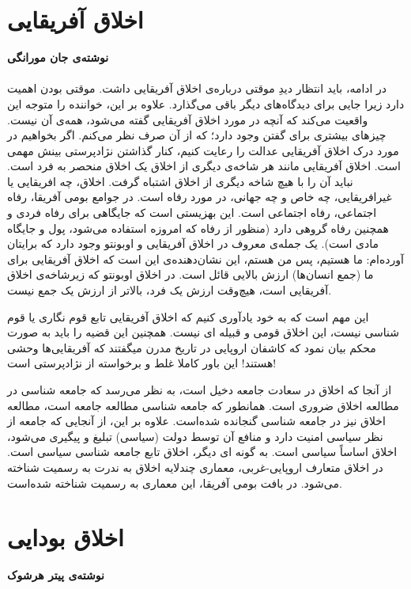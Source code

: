 \newpage


\section*{اخلاق آفریقایی}
\label{sec:اخلاق آفریقایی}
\textbf{نوشته‌ی جان مورانگی}
\paragraph{}
در ادامه، باید انتظار دیدِ موقتی درباره‌ی اخلاق آفریقایی داشت.
موقتی بودن اهمیت دارد زیرا جایی برای دیدگاه‌های دیگر باقی می‌گذارد.
علاوه بر این، خواننده را متوجه این واقعیت می‌کند که آنچه در مورد اخلاق آفریقایی گفته می‌شود، همه‌ی آن نیست.
چیزهای بیشتری برای گفتن وجود دارد؛ که از آن صرف نظر می‌کنم.
اگر بخواهیم در مورد درک اخلاق آفریقایی عدالت را رعایت کنیم، کنار گذاشتن نژادپرستی بینش مهمی است.
اخلاق آفریقایی مانند هر شاخه‌ی دیگری از اخلاق یک اخلاق منحصر به فرد است.
نباید آن را با هیچ شاخه دیگری از اخلاق اشتباه گرفت.
اخلاق، چه افریقایی یا غیرافریقایی، چه خاص و چه جهانی، در مورد رفاه است.
در جوامع بومی آفریقا، رفاه اجتماعی، رفاه اجتماعی است.
این بهزیستی است که جایگاهی برای رفاه فردی و همچنین رفاه گروهی دارد (منظور از رفاه که امروزه استفاده می‌شود، پول و جایگاه مادی است).
یک جمله‌ی معروف در اخلاق آفریقایی و اوبونتو وجود دارد که برایتان آورده‌ام: ما هستیم، پس من هستم، این نشان‌دهنده‌ی این است که اخلاق آفریقایی برای ما (جمع انسان‌ها) ارزش بالایی قائل است.
در اخلاق اوبونتو که زیرشاخه‌ی اخلاق آفریقایی است، هیچ‌وقت ارزش یک فرد، بالاتر از ارزش یک جمع نیست.

این مهم است که به خود یادآوری کنیم که اخلاق آفریقایی تابع قوم نگاری یا قوم شناسی نیست، این اخلاق قومی و قبیله ای نیست.
همچنین این قضیه را باید به صورت محکم بیان نمود که کاشفان اروپایی در تاریخ مدرن میگفتند که آفریقایی‌ها وحشی هستند!
این باور کاملا غلط و برخواسته از نژادپرستی است!

از آنجا که اخلاق در سعادت جامعه دخیل است، به نظر می‌رسد که جامعه شناسی در مطالعه اخلاق ضروری است.
همانطور که جامعه شناسی مطالعه جامعه است، مطالعه اخلاق نیز در جامعه شناسی گنجانده شده‌است.
علاوه بر این، از آنجایی که جامعه از نظر سیاسی امنیت دارد و منافع آن توسط دولت (سیاسی) تبلیغ و پیگیری می‌شود، اخلاق اساساً سیاسی است.
به گونه ای دیگر، اخلاق تابع جامعه شناسی سیاسی است.
در اخلاق متعارف اروپایی-غربی، معماری چندلایه اخلاق به ندرت به رسمیت شناخته می‌شود.
در بافت بومی آفریقا، این معماری به رسمیت شناخته شده‌است.


\section*{اخلاق بودایی}
\label{sec:اخلاق بودایی}
\textbf{نوشته‌ی پیتر هرشوک}
